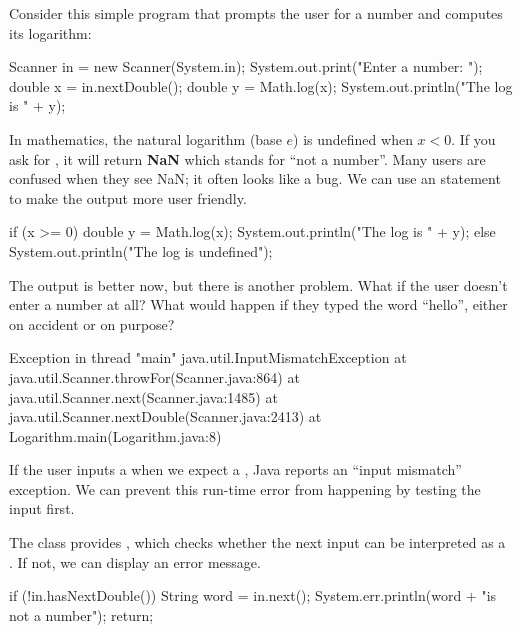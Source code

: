 Consider this simple program that prompts the user for a number and computes its logarithm:

\begin{code}
Scanner in = new Scanner(System.in);
System.out.print("Enter a number: ");
double x = in.nextDouble();
double y = Math.log(x);
System.out.println("The log is " + y);
\end{code}

In mathematics, the natural logarithm (base $e$) is undefined when $x < 0$.
If you ask for , it will return {\bf NaN} which stands for ``not a number''.
Many users are confused when they see NaN; it often looks like a bug.
We can use an  statement to make the output more user friendly.

\begin{code}
if (x >= 0) {
    double y = Math.log(x);
    System.out.println("The log is " + y);
} else {
    System.out.println("The log is undefined");
}
\end{code}

The output is better now, but there is another problem.
What if the user doesn't enter a number at all?
What would happen if they typed the word ``hello'', either on accident or on purpose?


\begin{small}
\begin{stdout}
Exception in thread "main" java.util.InputMismatchException
    at java.util.Scanner.throwFor(Scanner.java:864)
    at java.util.Scanner.next(Scanner.java:1485)
    at java.util.Scanner.nextDouble(Scanner.java:2413)
    at Logarithm.main(Logarithm.java:8)
\end{stdout}
\end{small}


If the user inputs a  when we expect a , Java reports an ``input mismatch'' exception.
We can prevent this run-time error from happening by testing the input first.

The  class provides , which checks whether the next input can be interpreted as a .
If not, we can display an error message.

\begin{code}
if (!in.hasNextDouble()) {
    String word = in.next();
    System.err.println(word + "is not a number");
    return;
}
\end{code}

